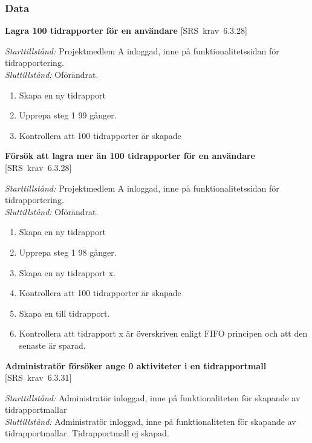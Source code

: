 \documentclass[a4paper]{article}
\def\reqinside{\hfil\penalty 100 \hfilneg \hbox}
\def \req [#1]{\reqinside{[SRS krav #1]}}
\begin{document}
\subsubsection{Data}

\begin{FT}

\item
\textbf{Lagra 100 tidrapporter för en användare} \req[6.3.28]

\emph{Starttillstånd:} Projektmedlem A inloggad, inne på funktionalitetssidan för tidrapportering.\\
\emph{Sluttillstånd:} Oförändrat.

\begin{enumerate}
\item Skapa en ny tidrapport
\item Upprepa steg 1 99 gånger.
\item Kontrollera att 100 tidrapporter är skapade
\end{enumerate}

\item
\textbf{Försök att lagra mer än 100 tidrapporter för en användare} \req[6.3.28]

\emph{Starttillstånd:} Projektmedlem A inloggad, inne på funktionalitetssidan för tidrapportering.\\
\emph{Sluttillstånd:} Oförändrat.

\begin{enumerate}
\item Skapa en ny tidrapport
\item Upprepa steg 1 98 gånger.
\item Skapa en ny tidrapport x.
\item Kontrollera att 100 tidrapporter är skapade
\item Skapa en till tidrapport. 
\item Kontrollera att tidrapport x är överskriven enligt FIFO principen och att den senaste är sparad.
\end{enumerate}




\item
\textbf{Administratör försöker ange 0 aktiviteter i en tidrapportmall} \req[6.3.31]

\emph{Starttillstånd:} Administratör inloggad, inne på funktionaliteten för skapande av tidrapportmallar\\
\emph{Sluttillstånd:} Administratör inloggad, inne på funktionaliteten för skapande av tidrapportmallar. Tidrapportmall ej skapad.\\


\end{FT}
\end{document}
